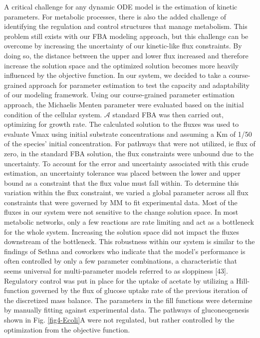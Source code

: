 \documentclass[12pt]{article}
\begin{document}
A critical challenge for any dynamic ODE model is the estimation of kinetic parameters. For metabolic processes, there is also the added challenge of identifying the regulation and control structures that manage metabolism. This problem still exists with our FBA modeling approach, but this challenge can be overcome by increasing the uncertainty of our kinetic-like flux constraints. By doing so, the distance between the upper and lower flux increased and therefore increase the solution space and the optimized solution becomes more heavily influenced by the objective function. In our system, we decided to take a course-grained approach for parameter estimation to test the capacity and adaptability of our modeling framework. Using our course-grained parameter estimation approach, the Michaelis Menten parameter were evaluated based on the initial condition of the cellular system. $\mathcal{A}$ standard FBA was then carried out, optimizing for growth rate. The calculated solution to the fluxes was used to evaluate Vmax using initial substrate concentrations and assuming a Km of 1/50 of the species’ initial concentration. For pathways that were not utilized, ie flux of zero, in the standard FBA solution, the flux constraints were unbound due to the uncertainty. To account for the error and uncertainty associated with this crude estimation, an uncertainty tolerance was placed between the lower and upper bound as a constraint that the flux value must fall within. To determine this variation within the flux constraint, we varied a global parameter across all flux constraints that were governed by MM to fit experimental data. Most of the fluxes in our system were not sensitive to the change solution space. In most metabolic networks, only a few reactions are rate limiting and act as a bottleneck for the whole system. Increasing the solution space did not impact the fluxes downstream of the bottleneck. This robustness within our system is similar to the findings of Sethna and coworkers who indicate that the model’s performance is often controlled by only a few parameter combinations, a characteristic that seems universal for multi-parameter models referred to as sloppiness [43]. Regulatory control was put in place for the uptake of acetate by utilizing a Hill-function governed by the flux of glucose uptake rate of the previous iteration of the discretized mass balance. The parameters in the fill functions were determine by manually fitting against experimental data. The pathways of gluconeogenesis shown in Fig. \ref{fig4-Ecoli}A were not regulated, but rather controlled by the optimization from the objective function. 
\end{document}
